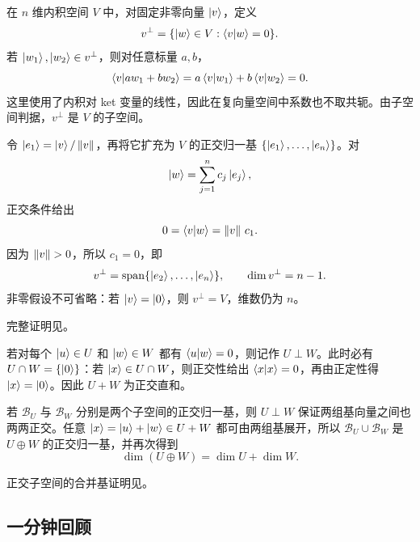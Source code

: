 在 $n$ 维内积空间 $V$ 中，对固定非零向量 $\left|v\right\rangle$，定义
\begin{equation}
  v^\perp=\{\left|w\right\rangle\in V:\left\langle v \middle| w \right\rangle=0\}.
  \label{eq:QM-C01-S04-vector-orthogonal-complement}
\end{equation}
若 $\left|w_1\right\rangle,\left|w_2\right\rangle\in v^\perp$，则对任意标量 $a,b$，
\[
  \left\langle v \middle| a w_1+b w_2 \right\rangle
  =a\left\langle v \middle| w_1 \right\rangle+b\left\langle v \middle| w_2 \right\rangle=0.
\]
这里使用了内积对 ket 变量的线性，因此在复向量空间中系数也不取共轭。由子空间判据，$v^\perp$ 是 $V$ 的子空间。

令 $\left|e_1\right\rangle=\left|v\right\rangle/\left\lVert v \right\rVert$，再将它扩充为 $V$ 的正交归一基 $\{\left|e_1\right\rangle,\ldots,\left|e_n\right\rangle\}$。对
\[
  \left|w\right\rangle=\sum_{j=1}^{n}c_j\left|e_j\right\rangle,
\]
正交条件给出
\[
  0=\left\langle v \middle| w \right\rangle=\left\lVert v \right\rVert\,c_1.
\]
因为 $\left\lVert v \right\rVert>0$，所以 $c_1=0$，即
\begin{equation}
  v^\perp=\operatorname{span}\{\left|e_2\right\rangle,\ldots,\left|e_n\right\rangle\},
  \qquad \dim v^\perp=n-1.
  \label{eq:QM-C01-S04-orthogonal-complement-dimension}
\end{equation}
非零假设不可省略：若 $\left|v\right\rangle=\left|0\right\rangle$，则 $v^\perp=V$，维数仍为 $n$。

完整证明见。


若对每个 $\left|u\right\rangle\in U$ 和 $\left|w\right\rangle\in W$ 都有 $\left\langle u \middle| w \right\rangle=0$，则记作 $U\perp W$。此时必有 $U\cap W=\{\left|0\right\rangle\}$：若 $\left|x\right\rangle\in U\cap W$，则正交性给出 $\left\langle x \middle| x \right\rangle=0$，再由正定性得 $\left|x\right\rangle=\left|0\right\rangle$。因此 $U+W$ 为正交直和。

若 $\mathcal B_U$ 与 $\mathcal B_W$ 分别是两个子空间的正交归一基，则 $U\perp W$ 保证两组基向量之间也两两正交。任意 $\left|x\right\rangle=\left|u\right\rangle+\left|w\right\rangle\in U+W$ 都可由两组基展开，所以 $\mathcal B_U\cup\mathcal B_W$ 是 $U\oplus W$ 的正交归一基，并再次得到
\[
  \dim(U\oplus W)=\dim U+\dim W.
\]


正交子空间的合并基证明见。

\subsection{一分钟回顾}

